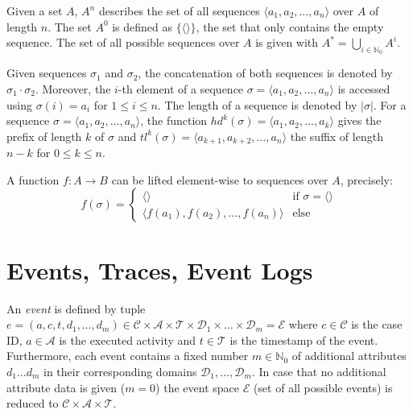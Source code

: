 Given a set $A$, $A^n$ describes the set of all sequences $\langle a_1, a_2, \dots, a_n\rangle$ over $A$ of length $n$.
The set $A^0$ is defined as $\{\langle \rangle\}$, the set that only contains the empty sequence.
The set of all possible sequences over $A$ is given with $A^* = \bigcup\limits_{i\in \mathbb{N}_0} A^i$.

Given sequences $\sigma_1$ and $\sigma_2$, the concatenation of both sequences is denoted by $\sigma_1 \cdot \sigma_2$.
Moreover, the $i$-th element of a sequence $\sigma = \langle a_1, a_2, \dots, a_n\rangle$ is accessed using $\sigma(i)= a_i$ for $1 \leq i \leq n$.
The length of a sequence is denoted by $|\sigma|$.
For a sequence $\sigma=\langle a_1, a_2, \dots, a_n\rangle$, the function
$hd^k(\sigma)= \langle a_1, a_2, \dots, a_k\rangle$ gives the prefix of length $k$ of $\sigma$ and $tl^k(\sigma)= \langle a_{k+1}, a_{k+2}, \dots, a_n\rangle$ the suffix of length $n-k$ for $0 \leq k \leq n$.

A function $f \colon A \to B$ can be lifted element-wise to sequences over $A$, precisely:
\begin{equation*}
f(\sigma) =
\begin{cases}
\langle \rangle & \text{if $\sigma = \langle \rangle$} \\
\langle f(a_1), f(a_2), \dots, f(a_n)\rangle & \text{else} 
\end{cases}
\end{equation*}

\section{Events, Traces, Event Logs}

\begin{definition}[Event]
An  \textit{event} is defined by tuple $e = (a,c,t,d_1,\dots, d_m) \in \mathcal{C} \times \mathcal{A}  \times \mathcal{T} \times \mathcal{D}_1 \times \dots \times \mathcal{D}_m =  \mathcal{E}$ where  $c \in \mathcal{C} $ is the case ID, $a \in \mathcal{A}$ is the executed activity and $t \in \mathcal{T}$ is the timestamp of the event.
Furthermore, each event contains a fixed number $m \in \mathbb{N}_0$ of additional attributes $d_1 \dots d_m$ in their corresponding domains $\mathcal{D}_1, \dots , \mathcal{D}_m$.
In case that no additional attribute data is given ($m = 0$) the event space $\mathcal{E}$ (set of all possible events) is reduced to $\mathcal{C} \times \mathcal{A}  \times \mathcal{T}$.
\end{definition}

